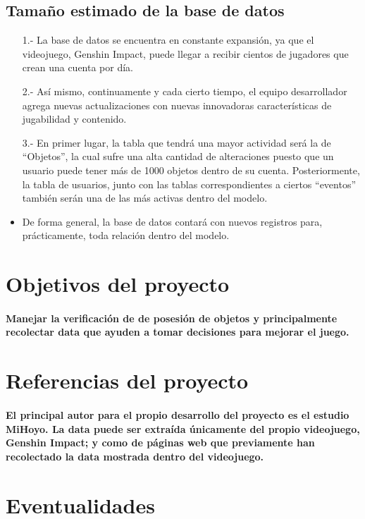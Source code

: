 \documentclass{report}
\begin{document}
\subsection{Tamaño estimado de la base de datos}
\begin{itemize}
    \item[1.- ] La base de datos se encuentra en constante expansión, ya que el videojuego, Genshin Impact, puede llegar a recibir cientos de jugadores que crean una cuenta por día.
    \item[2.- ]  Así mismo, continuamente y cada cierto tiempo, el equipo desarrollador agrega nuevas actualizaciones con nuevas innovadoras características de jugabilidad y contenido.
    \item[3.- ] En primer lugar, la tabla que tendrá una mayor actividad será la de “Objetos”, la cual sufre una alta cantidad de alteraciones puesto que un usuario puede tener más de 1000 objetos dentro de su cuenta. Posteriormente, la tabla de usuarios, junto con las tablas correspondientes a ciertos “eventos” también serán una de las más activas dentro del modelo.
    \item De forma general, la base de datos contará con nuevos registros para, prácticamente, toda relación dentro del modelo.
\end{itemize}

\section{ Objetivos del proyecto}
\paragraph{Manejar la verificación de de posesión de objetos y principalmente recolectar data que 
ayuden a tomar decisiones para mejorar el juego.}

\section{Referencias del proyecto}
\paragraph{El principal autor para el propio desarrollo del proyecto es el estudio MiHoyo. La data puede ser extraída únicamente del propio videojuego, Genshin Impact; y como de páginas web que previamente han recolectado la data mostrada dentro del videojuego. }

\section{Eventualidades}
\end{document}
